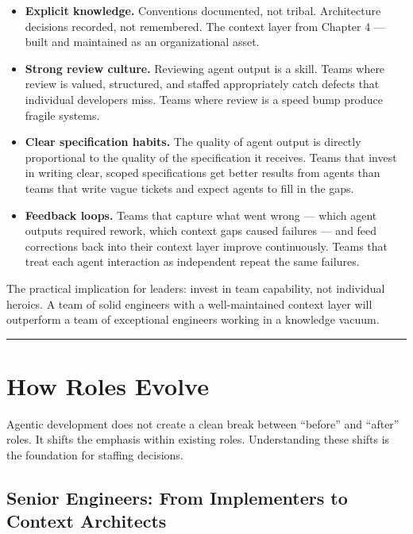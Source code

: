 \documentclass[
  a4paper,
  DIV=11,
  numbers=noendperiod]{scrreprt}
\providecommand{\tightlist}{%
  \setlength{\itemsep}{0pt}\setlength{\parskip}{0pt}}
\begin{document}
\begin{itemize}
\tightlist
\item
  \textbf{Explicit knowledge.} Conventions documented, not tribal.
  Architecture decisions recorded, not remembered. The context layer
  from Chapter 4 --- built and maintained as an organizational asset.
\item
  \textbf{Strong review culture.} Reviewing agent output is a skill.
  Teams where review is valued, structured, and staffed appropriately
  catch defects that individual developers miss. Teams where review is a
  speed bump produce fragile systems.
\item
  \textbf{Clear specification habits.} The quality of agent output is
  directly proportional to the quality of the specification it receives.
  Teams that invest in writing clear, scoped specifications get better
  results from agents than teams that write vague tickets and expect
  agents to fill in the gaps.
\item
  \textbf{Feedback loops.} Teams that capture what went wrong --- which
  agent outputs required rework, which context gaps caused failures ---
  and feed corrections back into their context layer improve
  continuously. Teams that treat each agent interaction as independent
  repeat the same failures.
\end{itemize}

The practical implication for leaders: invest in team capability, not
individual heroics. A team of solid engineers with a well-maintained
context layer will outperform a team of exceptional engineers working in
a knowledge vacuum.

\begin{center}\rule{0.5\linewidth}{0.5pt}\end{center}

\section{How Roles Evolve}\label{how-roles-evolve}

Agentic development does not create a clean break between ``before'' and
``after'' roles. It shifts the emphasis within existing roles.
Understanding these shifts is the foundation for staffing decisions.

\subsection{Senior Engineers: From Implementers to Context
Architects}\label{senior-engineers-from-implementers-to-context-architects}
\end{document}
